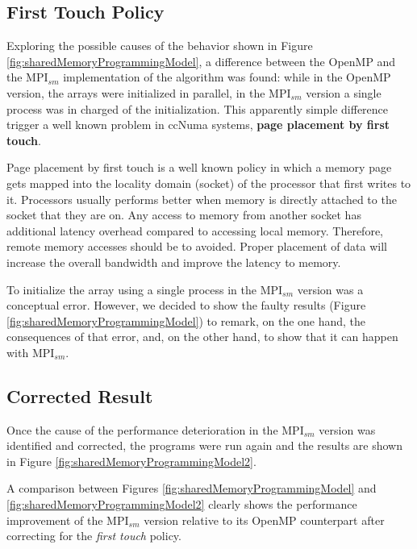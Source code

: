 \subsection*{First Touch Policy}

Exploring the possible causes of the behavior shown in Figure \ref{fig:sharedMemoryProgrammingModel}, a difference between the OpenMP and the MPI$_{sm}$ implementation of the algorithm was found: while in the OpenMP version, the arrays were initialized in parallel, in the MPI$_{sm}$ version a single process was in charged of the initialization. This apparently simple difference trigger a well known problem in ccNuma systems, \textbf{page placement by first touch}. 

\medskip

Page placement by first touch is a well known policy in which a memory page gets mapped into the locality domain (socket) of the processor that first writes to it. Processors usually performs better when memory is directly attached to the socket that they are on. Any access to memory from another socket has additional latency overhead compared to accessing local memory. Therefore, remote memory accesses should be to avoided. Proper placement of data will increase the overall bandwidth and improve the latency to memory.

\medskip

To initialize the array using a single process in the MPI$_{sm}$ version was a conceptual error. However, we decided to show the faulty results (Figure \ref{fig:sharedMemoryProgrammingModel}) to remark, on the one hand, the consequences of that error, and, on the other hand, to show that it can happen with MPI$_{sm}$.

\subsection*{Corrected Result}

Once the cause of the performance deterioration in the MPI$_{sm}$ version was identified and corrected, the programs were run again and the results are shown in Figure \ref{fig:sharedMemoryProgrammingModel2}.

\medskip

A comparison between Figures \ref{fig:sharedMemoryProgrammingModel} and \ref{fig:sharedMemoryProgrammingModel2} clearly shows the performance improvement of the MPI$_{sm}$ version relative to its OpenMP counterpart after correcting for the \emph{first touch} policy. 

